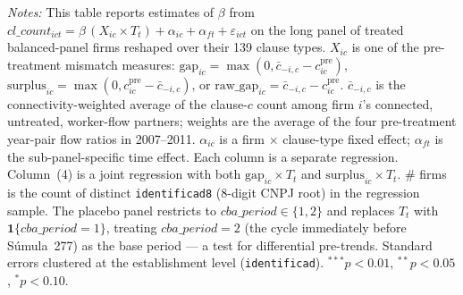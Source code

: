 \begin{table}[H]
\begin{minipage}{\linewidth}
\textit{Notes:} This table reports estimates of $\beta$ from $cl\_count_{ict} = \beta\,(X_{ic} \times T_t) + \alpha_{ic} + \alpha_{ft} + \varepsilon_{ict}$ on the long panel of treated balanced-panel firms reshaped over their 139 clause types. $X_{ic}$ is one of the pre-treatment mismatch measures: $\text{gap}_{ic} = \max(0, \bar{c}_{-i,c} - c^{\text{pre}}_{ic})$, $\text{surplus}_{ic} = \max(0, c^{\text{pre}}_{ic} - \bar{c}_{-i,c})$, or $\text{raw\_gap}_{ic} = \bar{c}_{-i,c} - c^{\text{pre}}_{ic}$. $\bar{c}_{-i,c}$ is the connectivity-weighted average of the clause-$c$ count among firm $i$'s connected, untreated, worker-flow partners; weights are the average of the four pre-treatment year-pair flow ratios in 2007--2011. $\alpha_{ic}$ is a firm $\times$ clause-type fixed effect; $\alpha_{ft}$ is the sub-panel-specific time effect. Each column is a separate regression. Column~(4) is a joint regression with both $\text{gap}_{ic} \times T_t$ and $\text{surplus}_{ic} \times T_t$. \# firms is the count of distinct \texttt{identificad8} (8-digit CNPJ root) in the regression sample. The placebo panel restricts to $cba\_period \in \{1, 2\}$ and replaces $T_t$ with $\mathbf{1}\{cba\_period = 1\}$, treating $cba\_period = 2$ (the cycle immediately before Súmula~277) as the base period — a test for differential pre-trends. Standard errors clustered at the establishment level (\texttt{identificad}). $^{***}p<0.01$, $^{**}p<0.05$, $^{*}p<0.10$.
\end{minipage}
\end{table}
